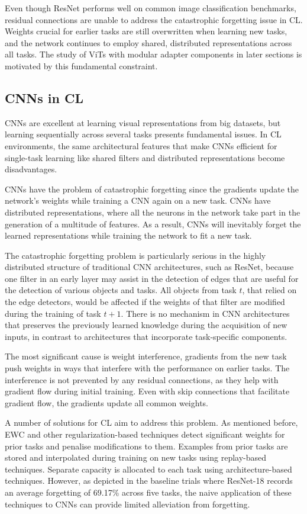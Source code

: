 \documentclass[english, LaM, oneside]{sapthesis}%
\numberwithin{equation}{chapter}
\begin{document}
Even though ResNet performs well on common image classification benchmarks, residual connections are unable to address the catastrophic forgetting issue in CL. Weights crucial for earlier tasks are still overwritten when learning new tasks, and the network continues to employ shared, distributed representations across all tasks. The study of ViTs with modular adapter components in later sections is motivated by this fundamental constraint.

\subsection{CNNs in CL}
\label{sec:3.2.3}
CNNs are excellent at learning visual representations from big datasets, but learning sequentially across several tasks presents fundamental issues. In CL environments, the same architectural features that make CNNs efficient for single-task learning like shared filters and distributed representations become disadvantages.

CNNs have the problem of catastrophic forgetting since the gradients update the network's weights while training a CNN again on a new task.  CNNs have distributed representations, where all the neurons in the network take part in the generation of a multitude of features. As a result, CNNs will inevitably forget the learned representations while training the network to fit a new task. 

The catastrophic forgetting problem is particularly serious in the highly distributed structure of traditional CNN architectures, such as ResNet\cite{14}, because one filter in an early layer may assist in the detection of edges that are useful for the detection of various objects and tasks. All objects from task $t$, that relied on the edge detectors, would be affected if the weights of that filter are modified during the training of task $t+1$. There is no mechanism in CNN architectures that preserves the previously learned knowledge during the acquisition of new inputs, in contrast to architectures that incorporate task-specific components.

The most significant cause is weight interference, gradients from the new task push weights in ways that interfere with the performance on earlier tasks. The interference is not prevented by any residual connections, as they help with gradient flow during initial training. Even with skip connections that facilitate gradient flow, the gradients update all common weights.

A number of solutions for CL aim to address this problem. As mentioned before, EWC\cite{2} and other regularization-based techniques detect significant weights for prior tasks and penalise modifications to them. Examples from prior tasks are stored and interpolated during training on new tasks using replay-based techniques. Separate capacity is allocated to each task using architecture-based techniques. However, as depicted in the baseline trials where ResNet-18 records an average forgetting of 69.17\% across five tasks, the naive application of these techniques to CNNs can provide limited alleviation from forgetting.
\end{document}
